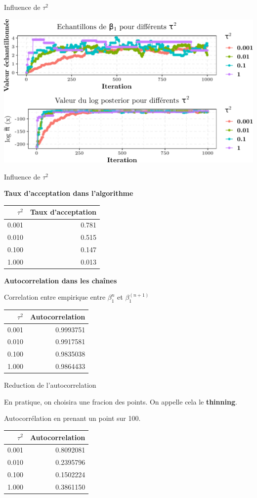\documentclass[9pt,ignorenonframetext,]{beamer}
\begin{document}
\begin{frame}{Influence de \(\tau^2\)}
\protect\hypertarget{influence-de-tau2}{}

\includegraphics{diapos_mcmc_files/figure-beamer/plot_mcmc_multiple_tau-1.pdf}

\end{frame}

\begin{frame}{Influence de \(\tau^2\)}
\protect\hypertarget{influence-de-tau2-1}{}

\textbf{Taux d'acceptation dans l'algorithme}

\begin{longtable}[]{@{}rr@{}}
\toprule
\(\tau^2\) & Taux d'acceptation\tabularnewline
\midrule
\endhead
0.001 & 0.781\tabularnewline
0.010 & 0.515\tabularnewline
0.100 & 0.147\tabularnewline
1.000 & 0.013\tabularnewline
\bottomrule
\end{longtable}

\pause

\textbf{Autocorrelation dans les chaînes}

Correlation entre empirique entre \(\beta_1^{n}\) et
\(\beta_1^{(n + 1)}\)

\begin{longtable}[]{@{}rr@{}}
\toprule
\(\tau^2\) & Autocorrelation\tabularnewline
\midrule
\endhead
0.001 & 0.9993751\tabularnewline
0.010 & 0.9917581\tabularnewline
0.100 & 0.9835038\tabularnewline
1.000 & 0.9864433\tabularnewline
\bottomrule
\end{longtable}

\end{frame}

\begin{frame}{Reduction de l'autocorrelation}
\protect\hypertarget{reduction-de-lautocorrelation}{}

En pratique, on choisira une fracion des points. On appelle cela le
\textbf{thinning}.\pause

Autocorrélation en prenant un point sur 100.

\begin{longtable}[]{@{}rr@{}}
\toprule
\(\tau^2\) & Autocorrelation\tabularnewline
\midrule
\endhead
0.001 & 0.8092081\tabularnewline
0.010 & 0.2395796\tabularnewline
0.100 & 0.1502224\tabularnewline
1.000 & 0.3861150\tabularnewline
\bottomrule
\end{longtable}

\end{frame}
\end{document}
